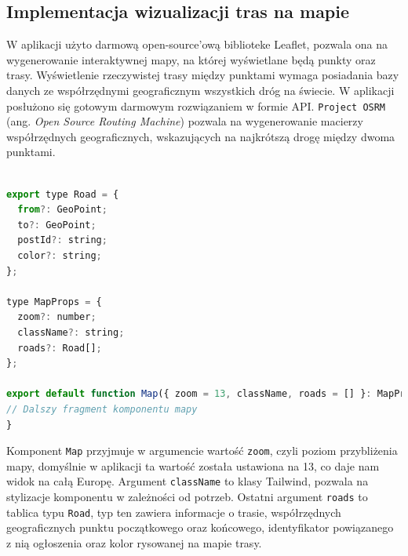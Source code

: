 \subsection{Implementacja wizualizacji tras na mapie}
W aplikacji użyto darmową open-source'ową biblioteke Leaflet, pozwala ona na wygenerowanie interaktywnej mapy, na której wyświetlane będą punkty oraz trasy. Wyświetlenie rzeczywistej trasy między punktami wymaga posiadania bazy danych ze współrzędnymi geograficznym wszystkich dróg na świecie. W aplikacji posłużono się gotowym darmowym rozwiązaniem w formie API. \texttt{Project OSRM} (ang. \emph{Open Source Routing Machine}) pozwala na wygenerowanie macierzy współrzędnych geograficznych, wskazujących na najkrótszą drogę między dwoma punktami.

{\belowcaptionskip=-9pt
\begin{lstlisting}[language=JavaScript,caption=Argumenty komponentu mapy, label=lst:mapProps]

export type Road = {
  from?: GeoPoint;
  to?: GeoPoint;
  postId?: string;
  color?: string;
};

type MapProps = {
  zoom?: number;
  className?: string;
  roads?: Road[];
};

export default function Map({ zoom = 13, className, roads = [] }: MapProps) {
// Dalszy fragment komponentu mapy
}
\end{lstlisting}
}

Komponent \texttt{Map} przyjmuje w argumencie wartość \texttt{zoom}, czyli poziom przybliżenia mapy, domyślnie w aplikacji ta wartość została ustawiona na 13, co daje nam widok na całą Europę. Argument \texttt{className} to klasy Tailwind, pozwala na stylizacje komponentu w zależności od potrzeb. Ostatni argument \texttt{roads} to tablica typu \texttt{Road}, typ ten zawiera informacje o trasie, współrzędnych geograficznych punktu początkowego oraz końcowego, identyfikator powiązanego z nią ogłoszenia oraz kolor rysowanej na mapie trasy.

